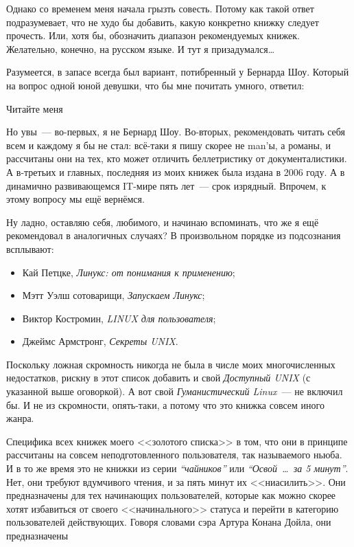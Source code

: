 Однако со временем меня начала грызть совесть. Потому как такой ответ подразумевает, что не худо бы добавить, какую конкретно книжку следует прочесть. Или, хотя бы, обозначить диапазон рекомендуемых книжек. Желательно, конечно, на русском языке. И тут я призадумался\dots

Разумеется, в запасе всегда был вариант, потибренный у Бернарда Шоу. Который на вопрос одной юной девушки, что бы мне почитать умного, ответил:


\begin{shadequote}{}
Читайте меня
\end{shadequote}

Но увы~--- во-первых, я не Бернард Шоу. Во-вторых, рекомендовать читать себя всем и каждому я бы не стал: всё-таки я пишу скорее не man'ы, а романы, и рассчитаны они на тех, кто может отличить беллетристику от документалистики. А в-третьих и главных, последняя из моих книжек была издана в 2006 году. А в динамично развивающемся IT-мире пять лет~--- срок изрядный. Впрочем, к этому вопросу мы ещё вернёмся.

Ну ладно, оставляю себя, любимого, и начинаю вспоминать, что же я ещё рекомендовал в аналогичных случаях? В произвольном порядке из подсознания всплывают:

\begin{itemize}
	\item Кай Петцке, \textit{Линукс: от понимания к применению};
	\item Мэтт Уэлш сотоварищи, \textit{Запускаем Линукс}; 
	\item Виктор Костромин, \textit{LINUX для пользователя}; 
	\item Джеймс Армстронг, \textit{Секреты UNIX}. 
\end{itemize}


Поскольку ложная скромность никогда не была в числе моих многочисленных недостатков, рискну в этот список добавить и свой \textit{Доступный UNIX} (с указанной выше оговоркой). А вот свой 
\textit{Гуманистический Linux}~--- не включил бы. И не из скромности, опять-таки, а потому что это книжка совсем иного жанра.

Специфика всех книжек моего <<золотого списка>> в том, что они в принципе рассчитаны на совсем неподготовленного пользователя, так называемого ньюба. И в то же время это не книжки из серии \textit{`` чайников''} или \textit{``Освой~\dots~за 5 минут''}. Нет, они требуют вдумчивого чтения, и за пять минут их <<ниасилить>>. Они предназначены для тех начинающих пользователей, которые как можно скорее хотят избавиться от своего <<начинального>> статуса и перейти в категорию пользователей действующих. Говоря словами сэра Артура Конана Дойла, они предназначены


